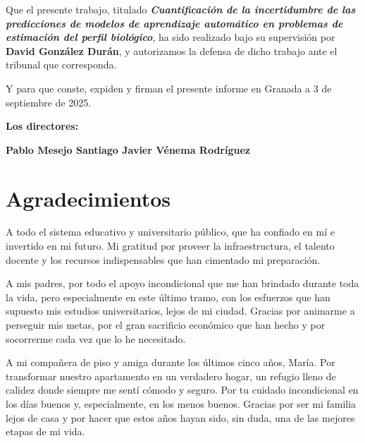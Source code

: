 Que el presente trabajo, titulado \textit{\textbf{Cuantificación de la incertidumbre de las predicciones de modelos de aprendizaje automático en problemas de estimación del perfil biológico}}, ha sido realizado bajo su supervisión por \textbf{David González Durán}, y autorizamos la defensa de dicho trabajo ante el tribunal que corresponda.

\vspace{0.5cm}

Y para que conste, expiden y firman el presente informe en Granada a 3 de septiembre de 2025.

\vspace{1cm}

\textbf{Los directores:}

\vspace{5cm}

\noindent \textbf{Pablo Mesejo Santiago \hfill Javier Vénema Rodríguez}


\cleardoublepage

\chapter*{\vspace{-1cm}Agradecimientos}
\thispagestyle{empty}

\vspace{0.1cm}

A todo el sistema educativo y universitario público, que ha confiado en mí e invertido en mi futuro. Mi gratitud por proveer la infraestructura, el talento docente y los recursos indispensables que han cimentado mi preparación. 

A mis padres, por todo el apoyo incondicional que me han brindado durante toda la vida, pero especialmente en este último tramo, con los esfuerzos que han supuesto mis estudios universitarios, lejos de mi ciudad.  Gracias por animarme a perseguir mis metas, por el gran sacrificio económico que han hecho y por socorrerme cada vez que lo he necesitado. 

A mi compañera de piso y amiga durante los últimos cinco años, María. Por transformar nuestro apartamento en un verdadero hogar, un refugio lleno de calidez donde siempre me sentí cómodo y seguro. Por tu cuidado incondicional en los días buenos y, especialmente, en los menos buenos. Gracias por ser mi familia lejos de casa y por hacer que estos años hayan sido, sin duda, una de las mejores etapas de mi vida.

